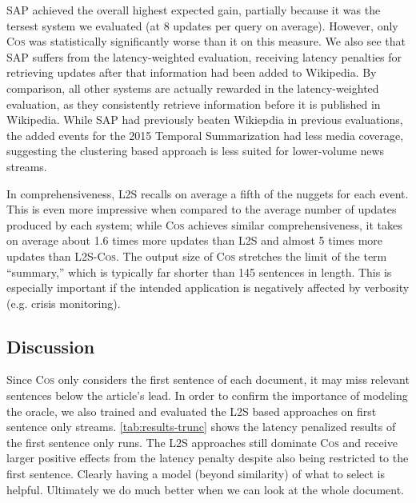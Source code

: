 \textsc{SAP} achieved the overall highest expected gain, partially because it
was the tersest system we evaluated (at 8 updates per query on average).
However, only \textsc{Cos} was statistically significantly worse than it on
this measure. We also see that SAP suffers from the latency-weighted
evaluation, receiving latency penalties for retrieving updates after that
information had been added to Wikipedia. By comparison, all other systems are
actually rewarded in the latency-weighted evaluation, as they consistently
retrieve information before it is published in Wikipedia. While SAP had
previously beaten Wikiepdia in previous evaluations, the added events for the
2015 Temporal Summarization had less media coverage, suggesting the clustering
based approach is less suited for lower-volume news streams.


 
In comprehensiveness, \textsc{L2S} recalls on average a fifth of the nuggets
for each event. This is even more impressive when  compared to the average
number of updates produced by each system; while \textsc{Cos} achieves similar
comprehensiveness, it takes on average about 1.6 times more updates than
\textsc{L2S} and almost 5 times more updates than \textsc{L2S-Cos}. The output
size of \textsc{Cos} stretches the limit of the term ``summary,'' which is
typically far shorter than 145 sentences in length.  This is especially
important if the intended application is negatively affected by verbosity (e.g.
crisis monitoring).



\subsection{Discussion} \label{sec:discussion}

Since \textsc{Cos} only considers the first sentence of each document, it may
miss relevant sentences below the article's lead. In order to confirm the
importance of modeling the oracle, we also trained and evaluated the
\textsc{L2S} based approaches on first sentence only streams.
\autoref{tab:results-trunc} shows the latency penalized results of the first
sentence only runs.  The \textsc{L2S} approaches still dominate \textsc{Cos}
and receive larger positive effects from the latency penalty despite also being
restricted to the first sentence. Clearly having a model (beyond similarity) of
what to select is helpful. Ultimately we do much better when we can look at the
whole document.

